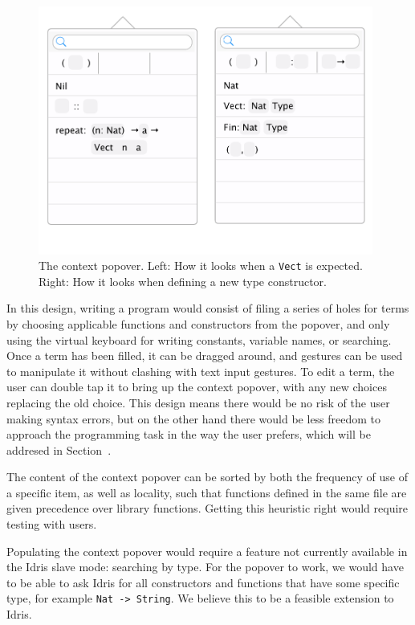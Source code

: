 \begin{figure}
	\centering
		\includegraphics[width=110mm]{diagrams/final_design_popover.pdf}
	\caption{The context popover. Left: How it looks when a \texttt{Vect} is
	expected. Right: How it looks when defining a new type constructor.}
\label{fig:new_design_popover}
\end{figure}

In this design, writing a program would consist of filing a series of holes for terms by choosing applicable functions and constructors from the popover, and only using the virtual keyboard for writing constants, variable names, or searching.
Once a term has been filled, it can be dragged around, and gestures can be used to manipulate it without clashing with text input gestures.
To edit a term, the user can double tap it to bring up the context popover, with any new choices replacing the old choice.
This design means there would be no risk of the user making syntax errors, but on the other hand there would be less freedom to approach the programming task in the way the user prefers, which will be addresed in Section~.

The content of the context popover can be sorted by both the frequency of use of a specific item, as well as locality, such that functions defined in the same file are given precedence over library functions.
Getting this heuristic right would require testing with users.

Populating the context popover would require a feature not currently available in the Idris slave mode: searching by type.
For the popover to work, we would have to be able to ask Idris for all constructors and functions that have some specific type, for example \texttt{Nat -> String}.
We believe this to be a feasible extension to Idris. 

